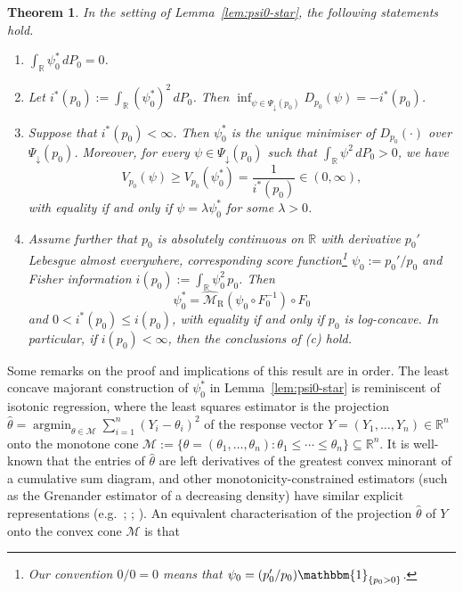 \documentclass[a4paper]{article}
\newcommand{\R}{\mathbb{R}}
\newcommand{\Ind}{\mathbbm{1}}
\DeclareMathOperator*{\argmin}{argmin}
\newtheorem{theorem}{Theorem}
\theoremstyle{definition}
\begin{document}
\begin{theorem}
\label{thm:antitonic-score-proj}
In the setting of Lemma~\ref{lem:psi0-star}, the following statements hold.
\begin{enumerate}[label=(\alph*)]
\item $\int_\R\psi_0^*\,dP_0 = 0$.
\item Let $i^*(p_0) := \int_\R(\psi_0^*)^2\,dP_0$. Then $\inf_{\psi \in \Psi_\downarrow(p_0)}D_{p_0}(\psi) = -i^*(p_0)$.
\item Suppose that $i^*(p_0) < \infty$. Then $\psi_0^*$ is the unique minimiser of $D_{p_0}(\cdot)$ over $\Psi_\downarrow(p_0)$. Moreover, for every $\psi \in \Psi_\downarrow(p_0)$ such that $\int_\R\psi^2\,dP_0 > 0$, we have 
\begin{equation}
\label{eq:antitonic-fisher-LB}
V_{p_0}(\psi) \geq V_{p_0}(\psi_0^*) = \frac{1}{i^*(p_0)} \in (0,\infty),
\end{equation}
with equality if and only if $\psi = \lambda\psi_0^*$ for some $\lambda > 0$.
\item Assume further that $p_0$ is absolutely continuous on $\R$ with derivative $p_0'$ Lebesgue almost everywhere, corresponding score function\footnote{Our convention $0/0 = 0$ means that $\psi_0 = (p_0'/p_0)\Ind_{\{p_0 > 0\}}$.} $\psi_0 := p_0'/p_0$ and Fisher information $i(p_0) := \int_\R \psi_0^2\,p_0$. Then
\begin{equation}
\label{eq:psi0-star}
\psi_0^* = \widehat{\mathcal{M}}_\mathrm{R}(\psi_0 \circ F_0^{-1}) \circ F_0
\end{equation}
and $0 < i^*(p_0) \leq i(p_0)$, with equality if and only if $p_0$ is log-concave.  In particular, if $i(p_0) < \infty$, then the conclusions of \textit{(c)} hold.
\end{enumerate}
\end{theorem}
Some remarks on the proof and implications of this result are in order.  The least concave majorant construction of $\psi_0^*$ in Lemma~\ref{lem:psi0-star} is reminiscent of isotonic regression, where the least squares estimator is the projection $\widehat{\theta} = \argmin_{\theta \in \mathcal{M}} \sum_{i=1}^n (Y_i - \theta_i)^2$ of the response vector $Y = (Y_1,\dotsc,Y_n) \in \R^n$ onto the monotone cone $\mathcal{M} := \bigl\{\theta = (\theta_1,\dotsc,\theta_n) : \theta_1 \leq \cdots \leq \theta_n\bigr\} \subseteq \R^n$. It is well-known that the entries of $\widehat{\theta}$ are left derivatives of the greatest convex minorant of a cumulative sum diagram, and other monotonicity-constrained estimators (such as the Grenander estimator of a decreasing density) have similar explicit representations (e.g.~\citealp[Chapter~1]{robertson1988order}; \citealp[Chapter~2]{groeneboom14nonparametric}; \citealp[Chapter~9]{samworth24modern}). An equivalent characterisation of the projection $\widehat{\theta}$ of $Y$ onto the convex cone $\mathcal{M}$ is that
\end{document}
